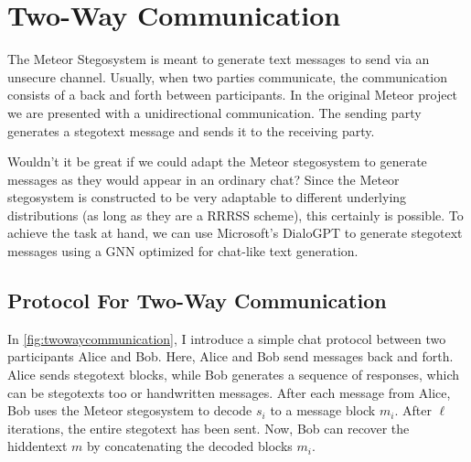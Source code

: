 \chapter{Two-Way Communication}
\label{chap:twowaycommunication}

The Meteor Stegosystem is meant to generate text messages to send via an unsecure channel.
Usually, when two parties communicate, the communication consists of a back and forth between participants.
In the original Meteor project we are presented with a unidirectional communication.
The sending party generates a stegotext message and sends it to the receiving party.

Wouldn't it be great if we could adapt the Meteor stegosystem to generate messages as they would appear in an ordinary chat?
Since the Meteor stegosystem is constructed to be very adaptable to different underlying distributions (as long as they are a RRRSS scheme), this certainly is possible.
To achieve the task at hand, we can use Microsoft's DialoGPT \cite{Zhang2020} to generate stegotext messages using a GNN optimized for chat-like text generation.

\section{Protocol For Two-Way Communication}

In \autoref{fig:twowaycommunication}, I introduce a simple chat protocol between two participants Alice and Bob.
Here, Alice and Bob send messages back and forth.
Alice sends stegotext blocks, while Bob generates a sequence of responses, which can be stegotexts too or handwritten messages.
After each message from Alice, Bob uses the Meteor stegosystem to decode $s_i$ to a message block $m_i$.
After $\ell$ iterations, the entire stegotext has been sent.
Now, Bob can recover the hiddentext $m$ by concatenating the decoded blocks $m_i$.


